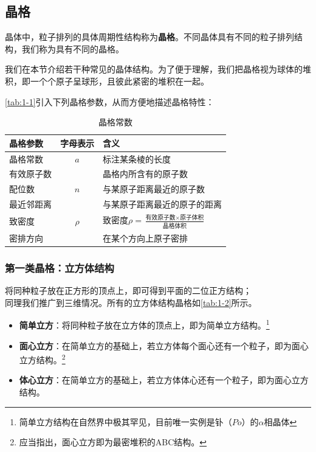 \subsection{晶格}
    晶体中，粒子排列的具体周期性结构称为\textbf{晶格}。不同晶体具有不同的粒子排列结构，我们称为具有不同的晶格。
    
    我们在本节介绍若干种常见的晶体结构。为了便于理解，我们把晶格视为球体的堆积，即一个个原子呈球形，且彼此紧密的堆积在一起。

    \autoref{tab:1-1}引入下列晶格参数，从而方便地描述晶格特性：
    \begin{table}[!htbp]
        \centering
        \setlength{\tabcolsep}{1em}
        \begin{tabular}{lcl}
            \toprule
            晶格参数    &   字母表示    &   含义    \\
            \midrule
            晶格常数    &   $a$     &   标注某条棱的长度\\
            有效原子数  &           &   晶格内所含有的原子数\\
            配位数      &   $n$     &   与某原子距离最近的原子数\\
            最近邻距离  &           &   与某原子距离最近的原子的距离\\
            致密度      &   $\rho$  &   $\mbox{致密度}\rho=\frac{\mbox{有效原子数}\times \mbox{原子体积}}{\mbox{晶格体积}}$\\
            密排方向    &           &   在某个方向上原子密排\\
            \bottomrule
        \end{tabular}
        \caption{晶格常数}
        \label{tab:1-1}
    \end{table}

\newpage 
\subsubsection{第一类晶格：立方体结构}
    将同种粒子放在正方形的顶点上，即可得到平面的二位正方结构；\\
    同理我们推广到三维情况。所有的立方体结构晶格如\autoref{tab:1-2}所示。
    \begin{itemize}[itemsep=0pt,parsep=0pt]
        \item \textbf{简单立方}：将同种粒子放在立方体的顶点上，即为简单立方结构。\footnote{简单立方结构在自然界中极其罕见，目前唯一实例是钋（$Po$）的$\alpha$相晶体}
        \item \textbf{面心立方}：在简单立方的基础上，若立方体每个面心还有一个粒子，即为面心立方结构。\footnote{应当指出，面心立方即为最密堆积的ABC结构。}
        \item \textbf{体心立方}：在简单立方的基础上，若立方体体心还有一个粒子，即为面心立方结构。
    \end{itemize}

